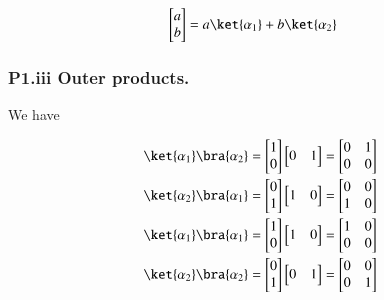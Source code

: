 \begin{align*}
\begin{bmatrix}
a \\
b
\end{bmatrix} &= 
a \ket{\alpha_1}
+b \ket{\alpha_2}
\end{align*}

\subsubsection{P1.iii Outer products.}

We have

\begin{align*}
\ket{\alpha_1}\bra{\alpha_2} &=
\begin{bmatrix}
1 \\
0
\end{bmatrix} 
\begin{bmatrix}
0 & 1
\end{bmatrix} 
=
\begin{bmatrix}
0 & 1 \\
0 & 0
\end{bmatrix} \\
\ket{\alpha_2}\bra{\alpha_1} &=
\begin{bmatrix}
0 \\
1
\end{bmatrix} 
\begin{bmatrix}
1 & 0
\end{bmatrix} 
=
\begin{bmatrix}
0 & 0 \\
1 & 0
\end{bmatrix} \\
\ket{\alpha_1}\bra{\alpha_1} &=
\begin{bmatrix}
1 \\
0
\end{bmatrix} 
\begin{bmatrix}
1 & 0
\end{bmatrix} 
=
\begin{bmatrix}
1 & 0 \\
0 & 0
\end{bmatrix} \\
\ket{\alpha_2}\bra{\alpha_2} &=
\begin{bmatrix}
0 \\
1
\end{bmatrix} 
\begin{bmatrix}
0 & 1
\end{bmatrix} 
=
\begin{bmatrix}
0 & 0 \\
0 & 1
\end{bmatrix} \\
\end{align*}

